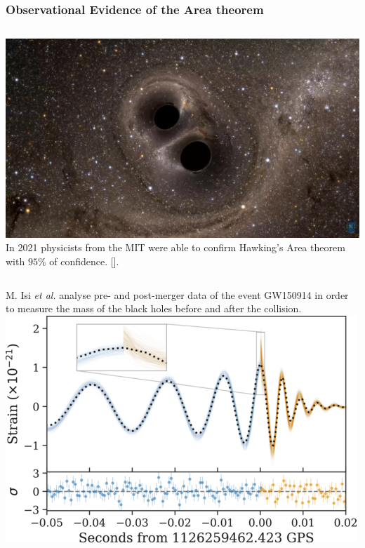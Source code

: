 \documentclass[]{beamer}
\begin{document}
	\begin{frame}
		\frametitle{Observational Evidence of the Area theorem}
		\begin{columns}
			\includegraphics[scale=0.14]{Immagini/BBH_gravitational_lensing_of_gw150914.webm.jpg}
			In 2021 physicists from the MIT were able to confirm Hawking's Area theorem with \(95\%\) of confidence. [\cite[]{PhysRevLett.127.011103}].
		\end{columns}
		
		\begin{columns}
			\column{0.47\textwidth}
			M. Isi \emph{et al.} analyse pre- and post-merger data of the event GW150914 in order to measure the mass of the black holes before and after the collision.
			\column{0.53\textwidth}
			\centering
			\includegraphics[scale=0.3]{Immagini/medium.png}
		\end{columns}
	\end{frame}
\end{document}
